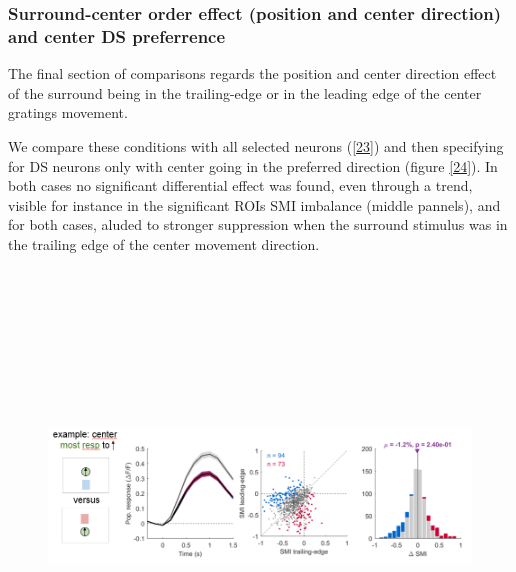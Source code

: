 \subsubsection{Surround-center order effect (position and center direction) and center DS preferrence}

The final section of comparisons regards the position and center direction effect of the surround being in the trailing-edge or in the leading edge of the center gratings movement.

We compare these conditions with all selected neurons (\ref{23}) and then specifying for DS neurons only with center going in the preferred direction (figure \ref{24}). In both cases no significant differential effect was found, even through a trend, visible for instance in the significant ROIs SMI imbalance (middle pannels), and for both cases, aluded to stronger suppression when the surround stimulus was in the trailing edge of the center movement direction.

\begin{figure}[H] \centering \includegraphics[width=12cm,height=12cm,keepaspectratio]{Figures/7.Results/finalPopulation/sel/diagrams/23.png} 
\end{figure}

